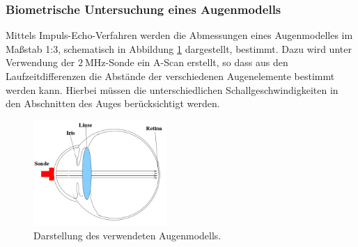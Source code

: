 \subsubsection{Biometrische Untersuchung eines Augenmodells}
Mittels Impuls-Echo-Verfahren werden die Abmessungen eines Augenmodelles im Maßstab 1:3, schematisch in Abbildung \ref{abb:3} dargestellt, bestimmt.
Dazu wird unter Verwendung der $\SI{2}{\mega\hertz}$-Sonde ein A-Scan erstellt, so dass aus den Laufzeitdifferenzen die Abstände der verschiedenen Augenelemente bestimmt werden kann.
Hierbei müssen die unterschiedlichen Schallgeschwindigkeiten in den Abschnitten des Auges berücksichtigt werden.

\begin{figure}
  \centering
  \includegraphics[height=4cm]{ressources/eyeoftheebberg.png}
  \caption{Darstellung des verwendeten Augenmodells. \cite{skript}}
  \label{abb:3}
\end{figure}
